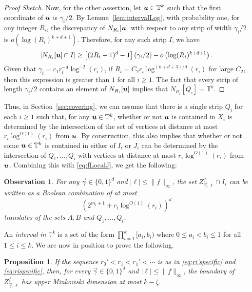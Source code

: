 \documentclass[12pt,a4paper]{amsart}
\numberwithin{equation}{section}
\newtheorem{proposition}[equation]{Proposition}
\newtheorem{obs}[equation]{Observation}
\theoremstyle{definition}
\begin{document}
\begin{proof}[Proof Sketch]
Now, for the other assertion, let $\boldsymbol{u}\in \mathbb{T}^k$ such that the first coordinate of $\boldsymbol{u}$ is $\gamma_i/2$. By Lemma~\ref{lem:intervalLog}, with probability one, for any integer $R_i$, the discrepancy of $N_{R_i}[\boldsymbol{u}]$ with respect to any strip of width $\gamma_i/2$ is $o\left(\log(R_i)^{k+d+1}\right)$. Therefore, for any such strip $I$, we have
\[|N_{R_i}[\boldsymbol{u}]\cap I| \geq \left[(2R_i+1)^d-1\right](\gamma_i/2) - o\left(\log(R_i)^{k+d+1}\right).\]
Given that $\gamma_i=c_1r_i^{-d}\log^{-2}(r_i)$, if $R_i=C_2 r_i\log^{(k+d+3)/d}(r_i)$ for large $C_2$, then this expression is greater than $1$ for all $i\geq1$. The fact that every strip of length $\gamma_i/2$ contains an element of $N_{R_i}[\boldsymbol{u}]$ implies that $N_{R_i}[Q_i]=\mathbb{T}^k$. 
\end{proof}

Thus, in Section~\ref{sec:covering}, we can assume that there is a single strip $Q_i$ for each $i\geq1$ such that, for any $\boldsymbol{u}\in \mathbb{T}^k$, whether or not $\boldsymbol{u}$ is contained in $X_i$ is determined by the intersection of the set of vertices at distance at most $r_i\log^{O(1)}(r_i)$ from $\boldsymbol{u}$. By construction, this also implies that whether or not some $\boldsymbol{u}\in\mathbb{T}^k$ is contained in either of $I_i$ or $J_i$ can be determined by the intersection of $Q_1,\dots,Q_i$ with vertices at distance at most $r_i\log^{O(1)}(r_i)$ from $\boldsymbol{u}$. Combining this with \eqref{eq:fLocalJ}, we get the following:

\begin{obs}
\label{obs:booleanABQ}
For any $\vec{\gamma}\in \{0,1\}^d$ and $|\ell|\leq \|f\|_\infty$, the set $Z_{\vec{\gamma},\ell}^f\cap I_i$ can be written as a Boolean combination of at most
\[\left(2^{m_i+1} + r_i\log^{O(1)}(r_i)\right)^d\] 
translates of the sets $A,B$ and $Q_1,\dots,Q_i$. 
\end{obs} 

An \emph{interval in} $\mathbb{T}^k$ is a set of the form $\prod_{i=1}^k[a_i,b_i)$ where $0\leq a_i<b_i\leq 1$ for all $1\leq i\leq k$.  We are now in position to prove the following.

\begin{proposition}
\label{prop:bdyDim}
If the sequence $r_0'<r_1<r_1'<\cdots$ is as in \eqref{eq:ri'specific} and \eqref{eq:rispecific}, then, for every $\vec{\gamma}\in\{0,1\}^d$ and $|\ell|\leq \|f\|_\infty$, the boundary of $Z_{\vec{\gamma},\ell}^f$ has upper Minkowski dimension at most $k-\zeta$.
\end{proposition}
\end{document}
